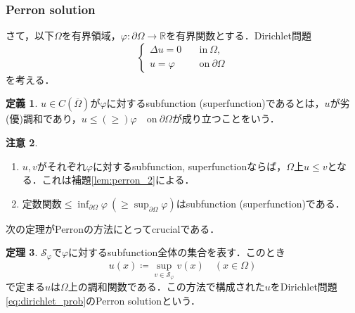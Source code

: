 \documentclass[a4paper]{ltjsarticle}
\newcommand{\Rset}{\mathbb{R}}
\newcommand{\Om}{\Omega}
\newcommand{\pOm}{\partial\Omega}
\newcommand{\Ombar}{\overline{\Omega}}
\newcommand{\inn}{\quad\text{in}\ }
\newcommand{\on}{\quad \text{on}\ }
\newcommand{\1}{\mathbbm{1}}
\numberwithin{equation}{section}
\theoremstyle{definition}
\newtheorem{thm}{定理}[section]
\newtheorem{dfn}[thm]{定義}
\newtheorem{rmk}[thm]{注意}
\begin{document}
\subsubsection{Perron solution}
さて，以下$\Om$を有界領域，$\varphi\colon \pOm\to \Rset$を有界関数とする．Dirichlet問題
\begin{equation}
    \begin{cases}
        \Delta u=0&\inn \Om,\\
        u=\varphi&\on \pOm
    \end{cases}\label{eq:dirichlet_prob}
\end{equation}
を考える．
\begin{dfn}
    $u\in C(\Ombar)$が$\varphi$に対するsubfunction (superfunction)であるとは，$u$が劣(優)調和であり，$u\leq(\geq) \varphi\on \pOm$が成り立つことをいう．
\end{dfn}
\begin{rmk}
    \begin{enumerate}
        \item $u,v$がそれぞれ$\varphi$に対するsubfunction, superfunctionならば，$\Om$上$u\leq v$となる．これは補題\ref{lem:perron_2}による．
        \item 定数関数$\leq \inf_{\pOm}\varphi\ (\geq \sup_{\pOm}\varphi)$はsubfunction (superfunction)である．
    \end{enumerate}
\end{rmk}
次の定理がPerronの方法にとってcrucialである．
\begin{thm}\label{thm:perron_sol}
    $\mathcal{S}_\varphi$で$\varphi$に対するsubfunction全体の集合を表す．このとき
    \begin{equation}
        u(x)\coloneqq \sup_{v\in \mathcal{S}_{\varphi}}v(x)\quad (x\in\Om)
    \end{equation}
    で定まる$u$は$\Om$上の調和関数である．この方法で構成された$u$をDirichlet問題\eqref{eq:dirichlet_prob}のPerron solutionという．
\end{thm}
\end{document}
